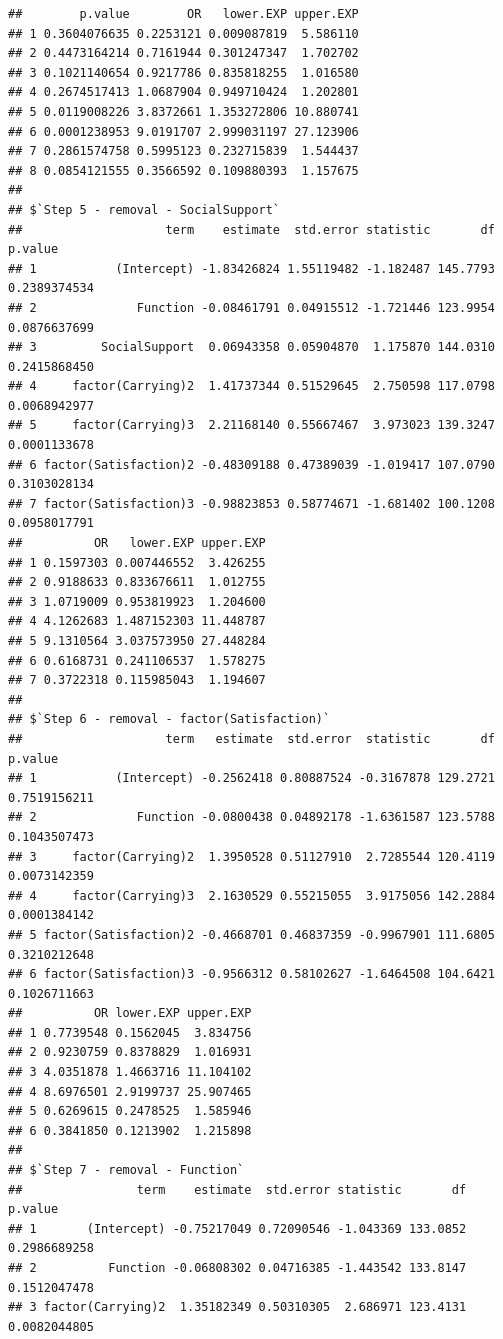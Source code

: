 \documentclass[
]{book}
\begin{document}
\begin{verbatim}
##        p.value        OR   lower.EXP upper.EXP
## 1 0.3604076635 0.2253121 0.009087819  5.586110
## 2 0.4473164214 0.7161944 0.301247347  1.702702
## 3 0.1021140654 0.9217786 0.835818255  1.016580
## 4 0.2674517413 1.0687904 0.949710424  1.202801
## 5 0.0119008226 3.8372661 1.353272806 10.880741
## 6 0.0001238953 9.0191707 2.999031197 27.123906
## 7 0.2861574758 0.5995123 0.232715839  1.544437
## 8 0.0854121555 0.3566592 0.109880393  1.157675
## 
## $`Step 5 - removal - SocialSupport`
##                    term    estimate  std.error statistic       df      p.value
## 1           (Intercept) -1.83426824 1.55119482 -1.182487 145.7793 0.2389374534
## 2              Function -0.08461791 0.04915512 -1.721446 123.9954 0.0876637699
## 3         SocialSupport  0.06943358 0.05904870  1.175870 144.0310 0.2415868450
## 4     factor(Carrying)2  1.41737344 0.51529645  2.750598 117.0798 0.0068942977
## 5     factor(Carrying)3  2.21168140 0.55667467  3.973023 139.3247 0.0001133678
## 6 factor(Satisfaction)2 -0.48309188 0.47389039 -1.019417 107.0790 0.3103028134
## 7 factor(Satisfaction)3 -0.98823853 0.58774671 -1.681402 100.1208 0.0958017791
##          OR   lower.EXP upper.EXP
## 1 0.1597303 0.007446552  3.426255
## 2 0.9188633 0.833676611  1.012755
## 3 1.0719009 0.953819923  1.204600
## 4 4.1262683 1.487152303 11.448787
## 5 9.1310564 3.037573950 27.448284
## 6 0.6168731 0.241106537  1.578275
## 7 0.3722318 0.115985043  1.194607
## 
## $`Step 6 - removal - factor(Satisfaction)`
##                    term   estimate  std.error  statistic       df      p.value
## 1           (Intercept) -0.2562418 0.80887524 -0.3167878 129.2721 0.7519156211
## 2              Function -0.0800438 0.04892178 -1.6361587 123.5788 0.1043507473
## 3     factor(Carrying)2  1.3950528 0.51127910  2.7285544 120.4119 0.0073142359
## 4     factor(Carrying)3  2.1630529 0.55215055  3.9175056 142.2884 0.0001384142
## 5 factor(Satisfaction)2 -0.4668701 0.46837359 -0.9967901 111.6805 0.3210212648
## 6 factor(Satisfaction)3 -0.9566312 0.58102627 -1.6464508 104.6421 0.1026711663
##          OR lower.EXP upper.EXP
## 1 0.7739548 0.1562045  3.834756
## 2 0.9230759 0.8378829  1.016931
## 3 4.0351878 1.4663716 11.104102
## 4 8.6976501 2.9199737 25.907465
## 5 0.6269615 0.2478525  1.585946
## 6 0.3841850 0.1213902  1.215898
## 
## $`Step 7 - removal - Function`
##                term    estimate  std.error statistic       df      p.value
## 1       (Intercept) -0.75217049 0.72090546 -1.043369 133.0852 0.2986689258
## 2          Function -0.06808302 0.04716385 -1.443542 133.8147 0.1512047478
## 3 factor(Carrying)2  1.35182349 0.50310305  2.686971 123.4131 0.0082044805

\end{verbatim}
\end{document}
